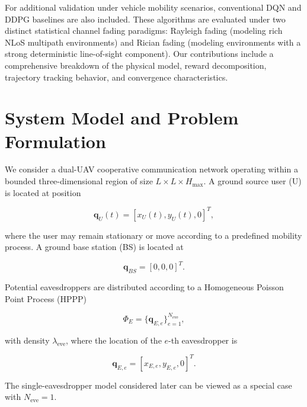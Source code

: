\documentclass[journal,onecolumn]{IEEEtran}
\begin{document}
For additional validation under vehicle mobility scenarios, conventional DQN and DDPG baselines are also included. These algorithms are evaluated under two distinct statistical channel fading paradigms: Rayleigh fading (modeling rich NLoS multipath environments) and Rician fading (modeling environments with a strong deterministic line-of-sight component). Our contributions include a comprehensive breakdown of the physical model, reward decomposition, trajectory tracking behavior, and convergence characteristics.

\section{System Model and Problem Formulation}

We consider a dual-UAV cooperative communication network operating within a bounded three-dimensional region of size $L \times L \times H_{\max}$. A ground source user (U) is located at position

\begin{equation}
\mathbf{q}_{U}(t)=[x_U(t),y_U(t),0]^T,
\end{equation}

where the user may remain stationary or move according to a predefined mobility process. A ground base station (BS) is located at

\begin{equation}
\mathbf{q}_{BS}=[0,0,0]^T.
\end{equation}

Potential eavesdroppers are distributed according to a Homogeneous Poisson Point Process (HPPP)

\begin{equation}
\Phi_E=\{\mathbf{q}_{E,e}\}_{e=1}^{N_{\text{eve}}},
\end{equation}

with density $\lambda_{\text{eve}}$, where the location of the $e$-th eavesdropper is

\begin{equation}
\mathbf{q}_{E,e}
=
[x_{E,e},y_{E,e},0]^T.
\end{equation}

The single-eavesdropper model considered later can be viewed as a special case with $N_{\text{eve}}=1$.

\end{document}
